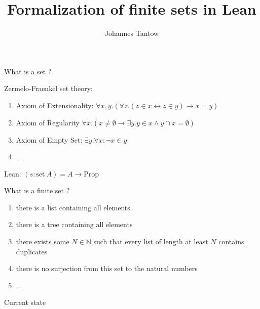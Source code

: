\documentclass{beamer}
\title[Finite sets]{Formalization of finite sets in Lean}
\author[J. Tantow]{Johannes Tantow}
\begin{document}
    \maketitle

    \begin{frame}{What is a set ?}

        Zermelo-Fraenkel set theory:
        \begin{enumerate}
            \item Axiom of Extensionality:
            $\forall x, y.(\forall z. (z \in x \leftrightarrow z \in y) \rightarrow x=y)$
            
            \item Axiom of Regularity 
            $\forall x. (x \neq \emptyset \rightarrow \exists y. y \in x \land y \cap x = \emptyset ) $
            
            \item Axiom of Empty Set: $\exists y. \forall x: \neg x \in y$
            \item ...
            
        \end{enumerate}
        \pause
        Lean:
        $(s: \text{{set}}\ A) = A \to \text{{Prop}}$
    \end{frame}
    \begin{frame}{What is a finite set ?}
        \begin{enumerate}
            \item there is a list containing all elements
            \item there is a tree containing all elements
            \item there exists some $N \in \mathbb{N}$ such that every list of length at least $N$ contains duplicates
            \item there is no surjection from this set to the natural numbers
            \item ...
        \end{enumerate}
    \end{frame}

    \begin{frame}{Current state}
        
    \end{frame}
\end{document}
